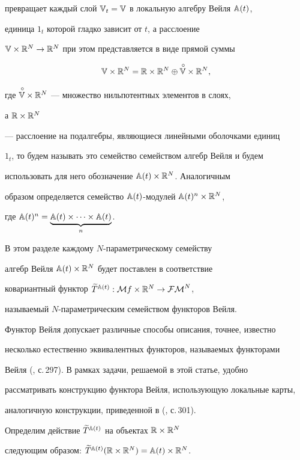 превращает каждый слой ${\Bbb V}_t={\Bbb V}$ в локальную алгебру Вейля ${\Bbb A}(t)$,


единица $1_t$ которой гладко зависит от $t$, а расслоение


${\Bbb V}\times{\Bbb R}^N\rightarrow{\Bbb R}^N$ при этом представляется в виде прямой суммы


\begin{equation}\label{decomp}


\V\times\R^N=\R\times\R^N\oplus\rad{\V}\times\R^N,


\end{equation}


где $\overset{\,\circ}{{\Bbb V}}{}\times{\Bbb R}^N$ --- множество нильпотентных элементов в слоях,


а ${\Bbb R}\times{\Bbb R}^N$


--- расслоение на подалгебры, являющиеся  линейными оболочками единиц


$1_t$, то будем называть это семейство семейством алгебр Вейля и будем


использовать для него обозначение ${\Bbb A}(t)\times{\Bbb R}^N$. Аналогичным


образом определяется  семейство ${\Bbb A}(t)$-модулей ${\Bbb A}(t)^n\times{\Bbb R}^N$,


где ${\Bbb A}(t)^n=\underbrace{{\Bbb A}(t)\times\dotsb\times{\Bbb A}(t)}_{n}$.


В этом разделе каждому $N$-параметрическому семейству


алгебр Вейля ${\Bbb A}(t)\times{\Bbb R}^N$ будет поставлен в соответствие


ковариантный функтор $\widetilde T{}^{{\Bbb A}(t)}:{\cal M} f\times{\Bbb R}^N\rightarrow{\cal{FM}}^N$,


называемый $N$-параметрическим семейством функторов Вейля.





Функтор Вейля допускает различные способы описания, точнее, известно


несколько естественно эквивалентных функторов, называемых функторами


Вейля (\cite{KMS}, с.\,297). В рамках задачи, решаемой в этой статье, удобно


рассматривать конструкцию функтора Вейля, использующую локальные карты,


аналогичную конструкции, приведенной в (\cite{KMS}, с.\,301).





Определим действие $\widetilde T{}^{{\Bbb A}(t)}$ на объектах ${\Bbb R}\times{\Bbb R}^N$


следующим образом: $\widetilde T{}^{{\Bbb A}(t)}({\Bbb R}\times{\Bbb R}^N)={\Bbb A}(t)\times{\Bbb R}^N$.


